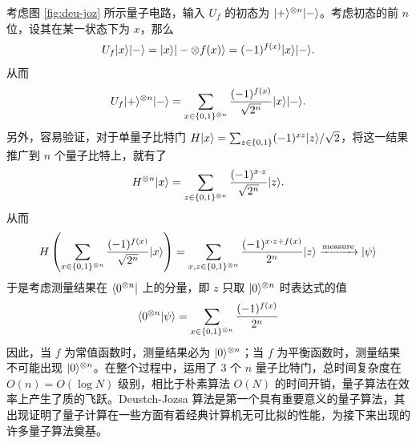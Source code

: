 考虑图 \ref{fig:deu-joz} 所示量子电路，输入 $U_f$ 的初态为 $|+\rangle^{\otimes n}|-\rangle$。考虑初态的前 $n$ 位，设其在某一状态下为 $x$，那么 \begin{align}
    U_f|x\rangle|-\rangle=|x\rangle|-\otimes f(x)\rangle=(-1)^{f(x)}|x\rangle|-\rangle.
\end{align}
从而 \begin{align}
    U_f|+\rangle^{\otimes n}|-\rangle=\sum_{x\in\{0,1\}^{\otimes n}}\frac{(-1)^{f(x)}}{\sqrt{2^n}}|x\rangle|-\rangle.
\end{align}
另外，容易验证，对于单量子比特门 $H|x\rangle=\sum_{z\in\{0,1\}}(-1)^{xz}|z\rangle/\sqrt{2}$，将这一结果推广到 $n$ 个量子比特上，就有了 \begin{align}
    H^{\otimes n}|x\rangle=\sum_{z\in\{0,1\}^{\otimes n}}\frac{(-1)^{x\cdot z}}{\sqrt{2^n}}|z\rangle.
\end{align}
从而 \begin{align}
    H\left(\sum_{x\in\{0,1\}^{\otimes n}}\frac{(-1)^{f(x)}}{\sqrt{2^n}}|x\rangle\right)=\sum_{x,z\in\{0,1\}^{\otimes n}}\frac{(-1)^{x\cdot z+f(x)}}{2^n}|z\rangle\xrightarrow{\text{measure}}|\psi\rangle
\end{align}
于是考虑测量结果在 $\langle0^{\otimes n}|$ 上的分量，即 $z$ 只取 $|0\rangle^{\otimes n}$ 时表达式的值 \begin{align}
    \langle0^{\otimes n}|\psi\rangle=\sum_{x\in\{0,1\}^{\otimes n}}\frac{(-1)^{f(x)}}{2^n}
\end{align}
因此，当 $f$ 为常值函数时，测量结果必为 $|0\rangle^{\otimes n}$；当 $f$ 为平衡函数时，测量结果不可能出现 $|0\rangle^{\otimes n}$。在整个过程中，运用了 $3$ 个 $n$ 量子比特门，总时间复杂度在 $O(n) = O(\log N)$ 级别，相比于朴素算法 $O(N)$ 的时间开销，量子算法在效率上产生了质的飞跃。Deustch-Jozsa 算法是第一个具有重要意义的量子算法，其出现证明了量子计算在一些方面有着经典计算机无可比拟的性能，为接下来出现的许多量子算法奠基。